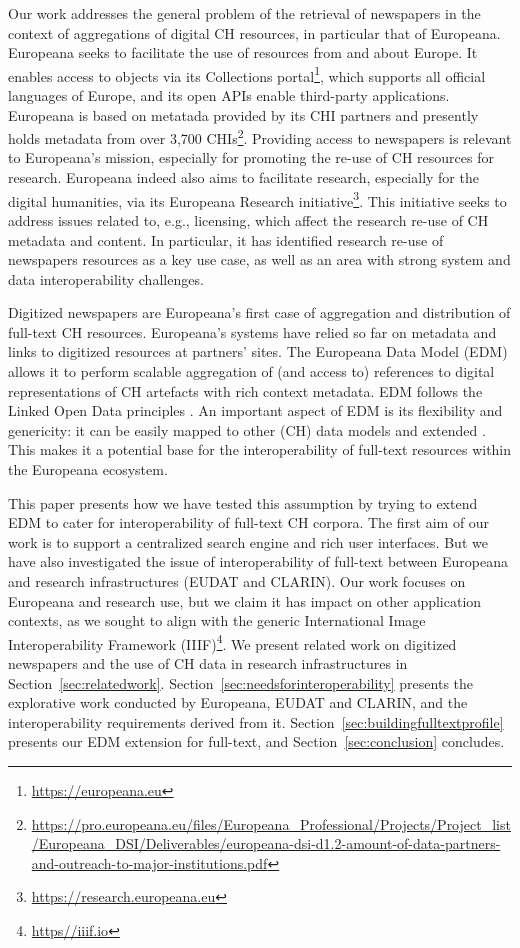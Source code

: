 \documentclass[a4paper,UKenglish,cleveref, autoref]{oasics-v2019}
\begin{document}
Our work addresses the general problem of the retrieval of newspapers in the context of aggregations of digital CH resources, in particular that of Europeana. Europeana seeks to facilitate the use of resources from and about Europe. It enables access to objects via its Collections 
portal\footnote{\url{https://europeana.eu}}, which supports all official languages of Europe, and its open APIs enable third-party applications. Europeana is based on metatada provided by its CHI partners and presently holds metadata from over 3,700
CHIs\footnote{\url{https://pro.europeana.eu/files/Europeana_Professional/Projects/Project_list/Europeana_DSI/Deliverables/europeana-dsi-d1.2-amount-of-data-partners-and-outreach-to-major-institutions.pdf}}.
Providing access to newspapers is relevant to Europeana's mission, especially for promoting the re-use of CH resources for research. Europeana indeed also aims to facilitate research, especially for the digital humanities, via its Europeana Research
initiative\footnote{\url{https://research.europeana.eu}}.
This initiative seeks to address issues related to, e.g., licensing, which affect the research re-use of CH metadata and content. In particular, it has identified research re-use of newspapers resources as a key use case, as well as an area with strong system and data interoperability challenges.

Digitized newspapers are Europeana's first case of aggregation and distribution of full-text CH resources. Europeana's systems have relied so far on metadata and links to digitized resources at partners' sites. The Europeana Data Model (EDM) \cite{edm} allows it to perform scalable aggregation of (and access to) references to digital representations of CH artefacts with rich context metadata. EDM follows the Linked Open Data principles \cite{BernersLee06}. An important aspect of EDM is its flexibility and genericity: it can be easily mapped to other (CH) data models and extended \cite{Charles15}. This makes it a potential base for the interoperability of full-text resources within the Europeana ecosystem.

This paper presents how we have tested this assumption by trying to extend EDM to cater for interoperability of full-text CH corpora. The first aim of our work is to support a centralized search engine and rich user interfaces. But we have also investigated the issue of interoperability of full-text between Europeana and research infrastructures (EUDAT and CLARIN). Our work focuses on Europeana and research use, but we claim it has impact on other application contexts, as we sought to align with the generic International Image Interoperability Framework
(IIIF)\footnote{\url{https//iiif.io}}. 
We present related work on digitized newspapers and the use of CH data in research infrastructures in Section~\ref{sec:relatedwork}. Section~\ref{sec:needsforinteroperability} presents the explorative work conducted by Europeana, EUDAT and CLARIN, and the interoperability requirements derived from it. Section~\ref{sec:buildingfulltextprofile} presents our EDM extension for full-text, and Section~\ref{sec:conclusion} concludes. 
\end{document}
